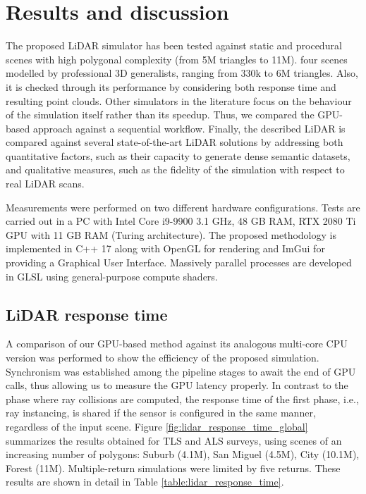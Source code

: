 \section{Results and discussion}

The proposed LiDAR simulator has been tested against static and procedural scenes with high polygonal complexity (from 5M triangles to 11M). four scenes modelled by professional 3D generalists, ranging from 330k to 6M triangles. Also, it is checked through its performance by considering both response time and resulting point clouds. Other simulators in the literature focus on the behaviour of the simulation itself rather than its speedup. Thus, we compared the GPU-based approach against a sequential workflow. Finally, the described LiDAR is compared against several state-of-the-art LiDAR solutions by addressing both quantitative factors, such as their capacity to generate dense semantic datasets, and qualitative measures, such as the fidelity of the simulation with respect to real LiDAR scans. 

Measurements were performed on two different hardware configurations. Tests are carried out in a PC with Intel Core i9-9900 3.1 GHz, 48 GB RAM, RTX 2080 Ti GPU with 11 GB RAM (Turing architecture). The proposed methodology is implemented in C++ 17 along with OpenGL for rendering and ImGui for providing a Graphical User Interface. Massively parallel processes are developed in GLSL using general-purpose compute shaders. 

\subsection{LiDAR response time}

A comparison of our GPU-based method against its analogous multi-core CPU version was performed to show the efficiency of the proposed simulation. Synchronism was established among the pipeline stages to await the end of GPU calls, thus allowing us to measure the GPU latency properly. In contrast to the phase where ray collisions are computed, the response time of the first phase, i.e., ray instancing, is shared if the sensor is configured in the same manner, regardless of the input scene. Figure \ref{fig:lidar_response_time_global} summarizes the results obtained for TLS and ALS surveys, using scenes of an increasing number of polygons: Suburb (4.1M), San Miguel (4.5M), City (10.1M), Forest (11M). Multiple-return simulations were limited by five returns. These results are shown in detail in Table \ref{table:lidar_response_time}.

